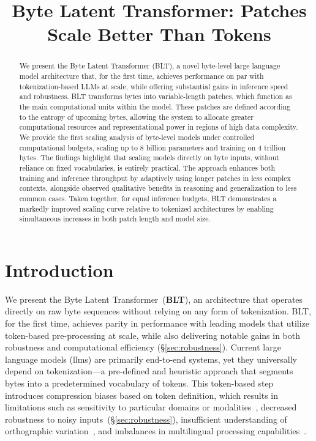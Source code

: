 \title{Byte Latent Transformer: Patches Scale Better Than Tokens}

\begin{abstract}
We present the Byte Latent Transformer ({\textsc BLT}), a novel byte-level large language model architecture that, for the first time, achieves performance on par with tokenization-based LLMs at scale, while offering substantial gains in inference speed and robustness. 
{\textsc BLT} transforms bytes into variable-length patches, which function as the main computational units within the model. These patches are defined according to the entropy of upcoming bytes, allowing the system to allocate greater computational resources and representational power in regions of high data complexity. We provide the first scaling analysis of byte-level models under controlled computational budgets, scaling up to 8 billion parameters and training on 4 trillion bytes. The findings highlight that scaling models directly on byte inputs, without reliance on fixed vocabularies, is entirely practical. The approach enhances both training and inference throughput by adaptively using longer patches in less complex contexts, alongside observed qualitative benefits in reasoning and generalization to less common cases. Taken together, for equal inference budgets, {\textsc BLT} demonstrates a markedly improved scaling curve relative to tokenized architectures by enabling simultaneous increases in both patch length and model size.
\end{abstract}

\section{Introduction}
\label{section:intro}

We present the Byte Latent Transformer~(\textbf{BLT}), an architecture that operates directly on raw byte sequences without relying on any form of tokenization. BLT, for the first time, achieves parity in performance with leading models that utilize token-based pre-processing at scale, while also delivering notable gains in both robustness and computational efficiency (\S\ref{sec:robustness}).
Current large language models (llms) are primarily end-to-end systems, yet they universally depend on tokenization—a pre-defined and heuristic approach that segments bytes into a predetermined vocabulary of tokens. This token-based step introduces compression biases based on token definition, which results in limitations such as sensitivity to particular domains or modalities~\citep{dagangetting}, decreased robustness to noisy inputs~(\S\ref{sec:robustness}), insufficient understanding of orthographic variation~\citep{edman2024cute}, and imbalances in multilingual processing capabilities~\citep{liang2023xlm,petrov2024language,limisiewicz2024myte}.

